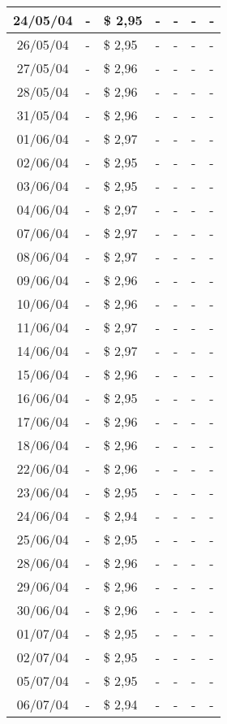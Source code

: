 \begin{center}
\begin{longtable}{|c|p{1.5cm}|p{1.5cm}|p{1.5cm}|p{1.5cm}|p{1.5cm}|p{1.5cm}|}
24/05/04 & - & \$ 2,95 & - & - & - & - \\ \hline
26/05/04 & - & \$ 2,95 & - & - & - & - \\ \hline
27/05/04 & - & \$ 2,96 & - & - & - & - \\ \hline
28/05/04 & - & \$ 2,96 & - & - & - & - \\ \hline
31/05/04 & - & \$ 2,96 & - & - & - & - \\ \hline
01/06/04 & - & \$ 2,97 & - & - & - & - \\ \hline
02/06/04 & - & \$ 2,95 & - & - & - & - \\ \hline
03/06/04 & - & \$ 2,95 & - & - & - & - \\ \hline
04/06/04 & - & \$ 2,97 & - & - & - & - \\ \hline
07/06/04 & - & \$ 2,97 & - & - & - & - \\ \hline
08/06/04 & - & \$ 2,97 & - & - & - & - \\ \hline
09/06/04 & - & \$ 2,96 & - & - & - & - \\ \hline
10/06/04 & - & \$ 2,96 & - & - & - & - \\ \hline
11/06/04 & - & \$ 2,97 & - & - & - & - \\ \hline
14/06/04 & - & \$ 2,97 & - & - & - & - \\ \hline
15/06/04 & - & \$ 2,96 & - & - & - & - \\ \hline
16/06/04 & - & \$ 2,95 & - & - & - & - \\ \hline
17/06/04 & - & \$ 2,96 & - & - & - & - \\ \hline
18/06/04 & - & \$ 2,96 & - & - & - & - \\ \hline
22/06/04 & - & \$ 2,96 & - & - & - & - \\ \hline
23/06/04 & - & \$ 2,95 & - & - & - & - \\ \hline
24/06/04 & - & \$ 2,94 & - & - & - & - \\ \hline
25/06/04 & - & \$ 2,95 & - & - & - & - \\ \hline
28/06/04 & - & \$ 2,96 & - & - & - & - \\ \hline
29/06/04 & - & \$ 2,96 & - & - & - & - \\ \hline
30/06/04 & - & \$ 2,96 & - & - & - & - \\ \hline
01/07/04 & - & \$ 2,95 & - & - & - & - \\ \hline
02/07/04 & - & \$ 2,95 & - & - & - & - \\ \hline
05/07/04 & - & \$ 2,95 & - & - & - & - \\ \hline
06/07/04 & - & \$ 2,94 & - & - & - & - \\ \hline

\end{longtable}
\end{center}
